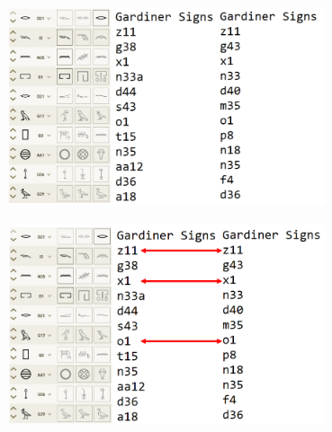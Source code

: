 \documentclass[unknownkeysallowed,usepdftitle=false, parskip=full, aspectratio=1610]{beamer}
\newcommand{\secvariable}{nothing}
\begin{document}
\begin{frame}\label{\secvariable}

\begin{center}
\includegraphics[width=0.7\textwidth,keepaspectratio]{figure/GardinerCodes.PNG}
\end{center}

\end{frame}



\begin{frame}\label{\secvariable}

\begin{center}
\includegraphics[width=0.7\textwidth,keepaspectratio]{figure/matches.PNG}
\end{center}

\end{frame}


\end{document}
